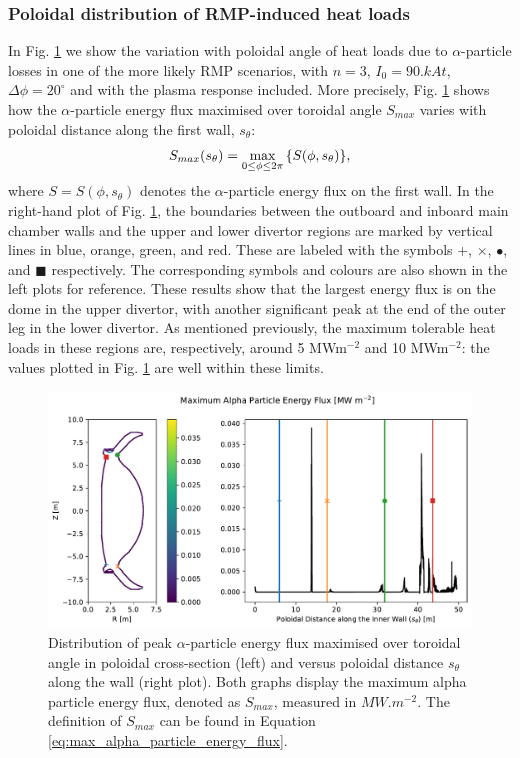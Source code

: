 \documentclass[10pt, a4paper, twoside]{article}
\begin{document}
\subsubsection{Poloidal distribution of RMP-induced heat loads}

In Fig. \ref{fig:energy_flux_distribution} we show the variation with poloidal angle of heat loads due to $\alpha$-particle losses in one of the more likely RMP scenarios, with $n=3$, $I_0= \si{90.kAt}$, $\Delta \phi = 20^\circ$ and with the plasma response included. More precisely, Fig. \ref{fig:energy_flux_distribution} shows how the $\alpha$-particle energy flux maximised over toroidal angle $S_{max}$ varies with poloidal distance along the first wall, $s_\theta$:
\begin{equation}
    \label{eq:max_alpha_particle_energy_flux}
    S_{max}(s_\theta) = \max_{0\le \phi \le 2\pi}\qty{S(\phi, s_\theta)},
\end{equation}
where $S=S(\phi, s_\theta)$ denotes the $\alpha$-particle energy flux on the first wall.
In the right-hand plot of Fig. \ref{fig:energy_flux_distribution}, the boundaries between the outboard and inboard main chamber walls and the upper and lower divertor regions are marked by vertical lines in blue, orange, green, and red. These are labeled with the symbols +, $\times$, $\bullet$, and $\blacksquare$ respectively. The corresponding symbols and colours are also shown in the left plots for reference. These results show that the largest energy flux is on the dome in the upper divertor, with another significant peak at the end of the outer leg in the lower divertor. As mentioned previously, the maximum tolerable heat loads in these regions are, respectively, around 5 MWm$^{-2}$ and 10 MWm$^{-2}$: the values plotted in Fig. \ref{fig:energy_flux_distribution} are well within these limits. 

\begin{figure}[!htb]
    \centering
    \includegraphics[width=0.99\linewidth]{Figures/energy_flux_distribution_rmp.pdf}
    \caption{Distribution of peak $\alpha$-particle energy flux maximised over toroidal angle in poloidal cross-section (left) and versus poloidal distance $s_\theta$ along the wall (right plot). Both graphs display the maximum alpha particle energy flux, denoted as $S_{max}$, measured in $\si{MW.m^{-2}}$. The definition of $S_{max}$ can be found in Equation \eqref{eq:max_alpha_particle_energy_flux}.}
    \label{fig:energy_flux_distribution}
\end{figure}
\end{document}
